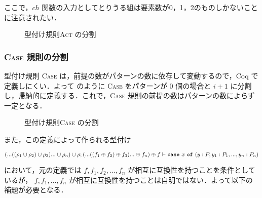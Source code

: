 ここで，$ch$ 関数の入力としてとりうる組は要素数が0，1，2のものしかないことに注意されたい．

\begin{figure*}[t]
  \vspace{14pt}
  \vspace{14pt}
  \vspace{14pt}

  \caption{型付け規則\textsc{Act} の分割}
  \label{coq:act}
\end{figure*}


\subsubsection{\textsc{Case} 規則の分割}

型付け規則 \textsc{Case} は，前提の数がパターンの数に依存して変動するので，Coq で定義しにくい．よって  のように \textsc{Case} をパターンが $0$ 個の場合と $i + 1$ に分割し，帰納的に定義する．これで，\textsc{Case} 規則の前提の数はパターンの数によらず一定となる．


\begin{figure*}[t]
  \vspace{14pt}

  \caption{型付け規則\textsc{Case} の分割}
  \label{api:case_split}
\end{figure*}


また，この定義によって作られる型付け
\begin{center}
  $(...((\rho_1 \cup \rho_2) \cup \rho_3)... \cup \rho_n) \cup \rho ; (...((f_1 \oplus f_2) \oplus f_3)... \oplus f_n) \oplus f \vdash {\tt case} \ x \ {\tt of} \ (y : P, y_1 : P_1, ..., y_n : P_n)$
\end{center}
において，元の定義では $f, f_1, f_2, ..., f_n$ が相互に互換性を持つことを条件としているが，
$f, f_1, ..., f_n$ が相互に互換性を持つことは自明ではない．よって以下の補題が必要となる．

